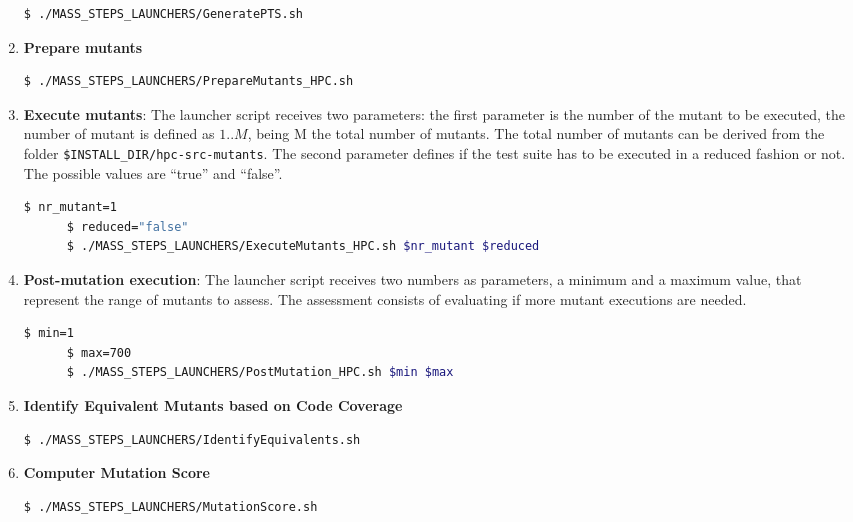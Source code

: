 \begin{enumerate}
	\begin{lstlisting}[language=bash]
	  $ ./MASS_STEPS_LAUNCHERS/GeneratePTS.sh
\end{lstlisting}

	\item \textbf{Prepare mutants}

	\begin{lstlisting}[language=bash]
	  $ ./MASS_STEPS_LAUNCHERS/PrepareMutants_HPC.sh
\end{lstlisting}

	\item \textbf{Execute mutants}: The launcher script receives two parameters: the first parameter is the number of the mutant to be executed, the number of mutant is defined as ${1..M}$, being M the total number of mutants. The total number of mutants can be derived from the folder \texttt{\$INSTALL\_DIR/hpc-src-mutants}.
	The second parameter defines if the test suite has to be executed in a reduced fashion or not. The possible values are ``true'' and ``false''.

	\begin{lstlisting}[language=bash]
	  $ nr_mutant=1
	  $ reduced="false"
	  $ ./MASS_STEPS_LAUNCHERS/ExecuteMutants_HPC.sh $nr_mutant $reduced
\end{lstlisting}

	\item \textbf{Post-mutation execution}: The launcher script receives two numbers as parameters, a minimum and a maximum value, that represent the range of mutants to assess. The assessment consists of evaluating if more mutant executions are needed. 

	\begin{lstlisting}[language=bash]
	  $ min=1
	  $	max=700
	  $ ./MASS_STEPS_LAUNCHERS/PostMutation_HPC.sh $min $max
\end{lstlisting}

	\item \textbf{Identify Equivalent Mutants based on Code Coverage}

	\begin{lstlisting}[language=bash]
	  $ ./MASS_STEPS_LAUNCHERS/IdentifyEquivalents.sh
\end{lstlisting}

	\item \textbf{Computer Mutation Score}

	\begin{lstlisting}[language=bash]
	  $ ./MASS_STEPS_LAUNCHERS/MutationScore.sh
\end{lstlisting} 
\end{enumerate}


